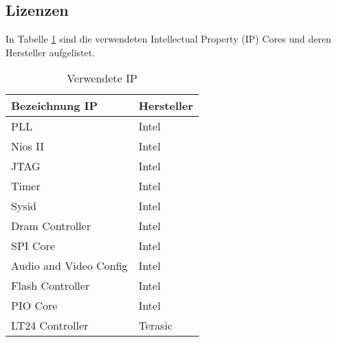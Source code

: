 \newpage
\subsection{Lizenzen}\label{subsec:Lizenzen Hardware}
In Tabelle \ref {tab:Verwendete_IP} sind die verwendeten Intellectual Property (IP) Cores und deren Hersteller aufgelistet.
\begin{table}[H]
	\centering
	\caption{Verwendete IP}
	\label{tab:Verwendete_IP}
	\begin{tabular}{l|l}
		\textbf{Bezeichnung IP} & \textbf{Hersteller}	\\
		\hline \hline
		
		PLL  & Intel   \\ 
		\hline
		Nios II  & Intel   \\ 
		\hline
			JTAG  & Intel   \\ 
		\hline
				Timer  & Intel   \\ 
		\hline
				Sysid		  & Intel   \\ 
		\hline
					Dram Controller		  & Intel   \\ 
		\hline
					 SPI Core		  & Intel   \\ 
		\hline
					Audio and Video Config		  & Intel   \\ 
		\hline
							Flash Controller		  & Intel   \\ 
		\hline
							PIO Core		  & Intel   \\ 
		\hline
		LT24 Controller  &  Terasic  \\ 
		\hline
	
	\end{tabular}
\end{table} 
